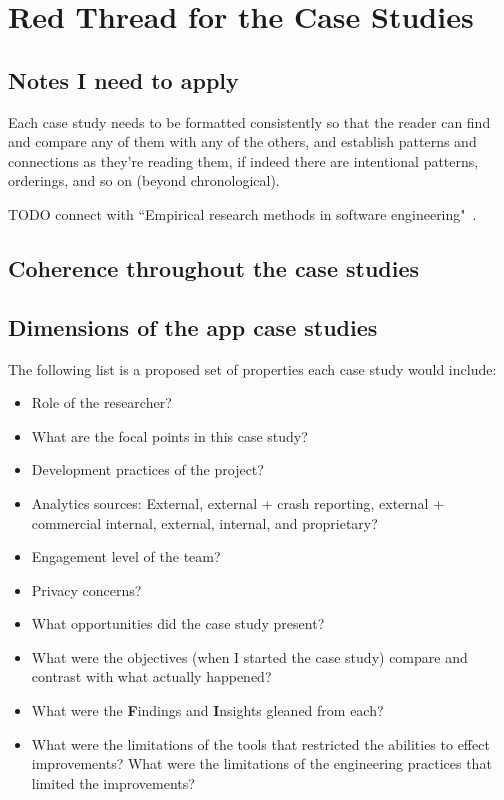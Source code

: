 \section{Red Thread for the Case Studies}
\label{section-case-studies-red-thread}

\subsection*{Notes I need to apply}
Each case study needs to be formatted consistently so that the reader can find and compare any of them with any of the others, and establish patterns and connections as they're reading them, if indeed there are intentional patterns, orderings, and so on (beyond chronological).

TODO connect with ``Empirical research methods in software engineering"~\citep{Wohlin2003_empirical_research_methods_in_software_engineering}.

\subsection{Coherence throughout the case studies}


\subsection{Dimensions of the app case studies}
The following list is a proposed set of properties each case study would include:
{\small
\begin{itemize}
    \itemsep0em
    \item Role of the researcher?
    \item What are the focal points in this case study?
    \item Development practices of the project?
    \item Analytics sources: External, external + crash reporting, external + commercial internal, external, internal, and proprietary?
    \item Engagement level of the team?
    \item Privacy concerns?
    \item What opportunities did the case study present?
    \item What were the objectives (when I started the case study) compare and contrast with what actually happened? 
    \item What were the \textbf{F}indings and \textbf{I}nsights gleaned from each?
    \item What were the limitations of the tools that restricted the abilities to effect improvements? What were the limitations of the engineering practices that limited the improvements?
\end{itemize}
}

